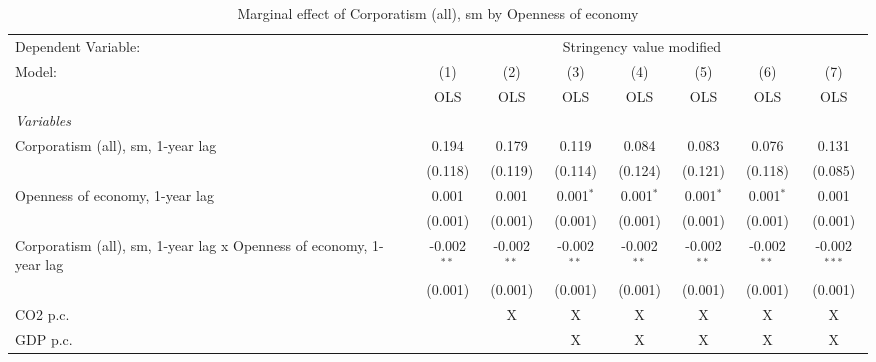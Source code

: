 
\begin{table}[htbp]
   \caption{Marginal effect of Corporatism (all), sm by Openness of economy}
   \centering
   \begin{tabular}{lccccccc}
      \toprule
      Dependent Variable: & \multicolumn{7}{c}{Stringency value modified}\\
      Model:                                                              & (1)           & (2)           & (3)           & (4)           & (5)           & (6)           & (7)\\  
                                                                          &  OLS          & OLS           & OLS           & OLS           & OLS           & OLS           & OLS\\  
      \midrule
      \emph{Variables}\\
      Corporatism (all), sm, 1-year lag                                   & 0.194         & 0.179         & 0.119         & 0.084         & 0.083         & 0.076         & 0.131\\   
                                                                          & (0.118)       & (0.119)       & (0.114)       & (0.124)       & (0.121)       & (0.118)       & (0.085)\\   
      Openness of economy, 1-year lag                                     & 0.001         & 0.001         & 0.001$^{*}$   & 0.001$^{*}$   & 0.001$^{*}$   & 0.001$^{*}$   & 0.001\\   
                                                                          & (0.001)       & (0.001)       & (0.001)       & (0.001)       & (0.001)       & (0.001)       & (0.001)\\   
      Corporatism (all), sm, 1-year lag x Openness of economy, 1-year lag & -0.002$^{**}$ & -0.002$^{**}$ & -0.002$^{**}$ & -0.002$^{**}$ & -0.002$^{**}$ & -0.002$^{**}$ & -0.002$^{***}$\\   
                                                                          & (0.001)       & (0.001)       & (0.001)       & (0.001)       & (0.001)       & (0.001)       & (0.001)\\   
      CO2 p.c.                                                            &               & X             & X             & X             & X             & X             & X\\  
      GDP p.c.                                                            &               &               & X             & X             & X             & X             & X\\  

\end{tabular}
\end{table}
